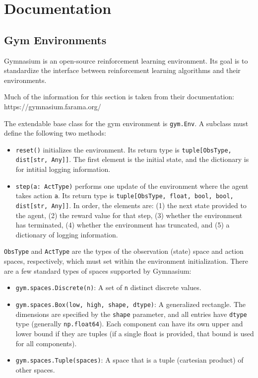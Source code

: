 \chapter{Documentation}

\section{Gym Environments}

Gymnasium is an open-source reinforcement learning environment.
Its goal is to standardize the interface between reinforcement learning algorithms
and their environments.

Much of the information for this section is taken from their documentation: https://gymnasium.farama.org/

The extendable base class for the gym environment is \texttt{gym.Env}. A subclass must define the following two methods:
\begin{itemize}
  \item \texttt{reset()} initializes the environment. Its return type is \texttt{tuple[ObsType, dist[str, Any]]}.
  The first element is the initial state, and the dictionary is for intitial logging information.
  \item \texttt{step(a: ActType)} performs one update of the environment where the agent takes action \texttt{a}.
  Its return type is \texttt{tuple[ObsType, float, bool, bool, dist[str, Any]]}. In order, the elements are:
  (1) the next state provided to the agent, (2) the reward value for that step, (3) whether the environment has terminated,
  (4) whether the environment has truncated, and (5) a dictionary of logging information.
\end{itemize}

\texttt{ObsType} and \texttt{ActType} are the types of the observation (state) space and action spaces, respectively,
which must set within the environment initialization. There are a few standard types of spaces supported by Gymnasium:

\begin{itemize}
  \item \texttt{gym.spaces.Discrete(n)}: A set of \texttt{n} distinct discrete values.
  \item \texttt{gym.spaces.Box(low, high, shape, dtype)}: A generalized rectangle. The dimensions are
  specified by the \texttt{shape} parameter, and all entries have \texttt{dtype} type (generally \texttt{np.float64}). Each component
  can have its own upper and lower bound if they are tuples (if a single float is provided, that bound is used for all components).
  \item \texttt{gym.spaces.Tuple(spaces)}: A space that is a tuple (cartesian product) of other spaces.
\end{itemize}

